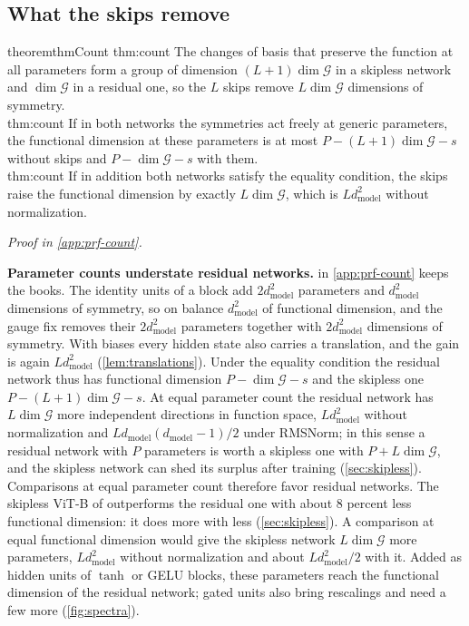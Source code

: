 \documentclass[10pt]{article}
\theoremstyle{definition}
\theoremstyle{remark}
\newcommand{\dm}{d_{\mathrm{model}}}
\newcommand{\G}{\mathcal{G}}
\newcommand{\para}[1]{\smallskip\noindent\textbf{#1}\hspace{0.5em}}
\newcommand{\ptlabel}[1]{\phantomsection\label{#1}}
\newcommand{\proofin}[1]{\par\vspace{-0.4\baselineskip}\noindent\hfill{\small\itshape Proof in \cref{#1}.}\par\smallskip}
\newcommand{\stpart}[3]{\ifx\relax#1\relax\else\ptlabel{#1:#2}\fi{\upshape\bfseries\boldmath(#2)\ifx\relax#3\relax\else\ #3.\fi}}
\begin{document}
\subsection{What the skips remove}\label{sec:count}

\begin{restatable}{theorem}{thmCount}\label{thm:count}
\stpart{thm:count}{i}{} The changes of basis that preserve the function at all parameters form a group of dimension $(L+1)\dim\G$ in a skipless network and $\dim\G$ in a residual one, so the $L$ skips remove $L\dim\G$ dimensions of symmetry.\\
\stpart{thm:count}{ii}{} If in both networks the symmetries act freely at generic parameters, the functional dimension at these parameters is at most $P - (L+1)\dim\G - s$ without skips and $P - \dim\G - s$ with them.\\
\stpart{thm:count}{iii}{} If in addition both networks satisfy the equality condition, the skips raise the functional dimension by exactly $L\dim\G$, which is $L\dm^2$ without normalization.
\end{restatable}
\proofin{app:prf-count}


\para{Parameter counts understate residual networks.}  in \cref{app:prf-count} keeps the books. The identity units of a block add $2\dm^2$ parameters and $\dm^2$ dimensions of symmetry, so on balance $\dm^2$ of functional dimension, and the gauge fix removes their $2\dm^2$ parameters together with $2\dm^2$ dimensions of symmetry. With biases every hidden state also carries a translation, and the gain is again $L\dm^2$ (\cref{lem:translations}). Under the equality condition the residual network thus has functional dimension $P - \dim\G - s$ and the skipless one $P - (L+1)\dim\G - s$. At equal parameter count the residual network has $L\dim\G$ more independent directions in function space, $L\dm^2$ without normalization and $L\dm(\dm-1)/2$ under RMSNorm; in this sense a residual network with $P$ parameters is worth a skipless one with $P + L\dim\G$, and the skipless network can shed its surplus after training (\cref{sec:skipless}). Comparisons at equal parameter count therefore favor residual networks. The skipless ViT-B of \citet{ji2026cutting} outperforms the residual one with about $8$ percent less functional dimension: it does more with less (\cref{sec:skipless}). A comparison at equal functional dimension would give the skipless network $L\dim\G$ more parameters, $L\dm^2$ without normalization and about $L\dm^2/2$ with it. Added as hidden units of $\tanh$ or GELU blocks, these parameters reach the functional dimension of the residual network; gated units also bring rescalings and need a few more (\cref{fig:spectra}).
\end{document}
